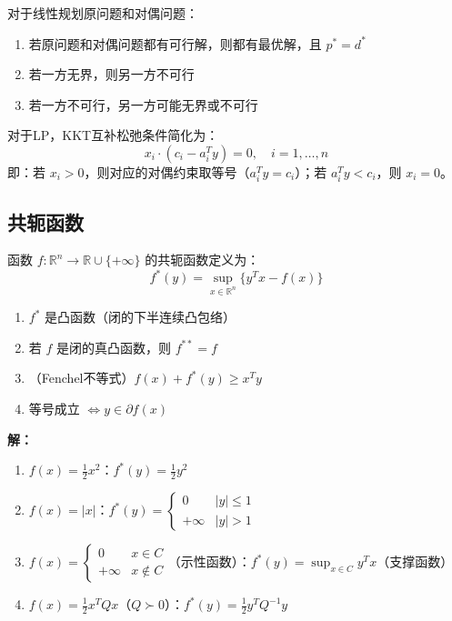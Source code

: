 \begin{theorem}[LP对偶定理]
对于线性规划原问题和对偶问题：
\begin{enumerate}
    \item 若原问题和对偶问题都有可行解，则都有最优解，且 $p^* = d^*$
    \item 若一方无界，则另一方不可行
    \item 若一方不可行，另一方可能无界或不可行
\end{enumerate}
\end{theorem}

\begin{notebox}[互补松弛条件（LP）]
对于LP，KKT互补松弛条件简化为：
\[
x_i \cdot (c_i - a_i^T y) = 0, \quad i = 1, \ldots, n
\]
即：若 $x_i > 0$，则对应的对偶约束取等号（$a_i^T y = c_i$）；若 $a_i^T y < c_i$，则 $x_i = 0$。
\end{notebox}

\subsection{共轭函数}

\begin{definition}[Fenchel共轭函数]
函数 $f: \mathbb{R}^n \to \mathbb{R} \cup \{+\infty\}$ 的共轭函数定义为：
\[
f^*(y) = \sup_{x \in \mathbb{R}^n} \{y^T x - f(x)\}
\]
\end{definition}

\begin{theorem}[共轭函数的性质]
\begin{enumerate}
    \item $f^*$ 是凸函数（闭的下半连续凸包络）
    \item 若 $f$ 是闭的真凸函数，则 $f^{**} = f$
    \item （Fenchel不等式）$f(x) + f^*(y) \geq x^T y$
    \item 等号成立 $\Leftrightarrow y \in \partial f(x)$
\end{enumerate}
\end{theorem}

\begin{example}[常见共轭函数]
\textbf{解：}

\begin{enumerate}
    \item $f(x) = \frac{1}{2}x^2$：$f^*(y) = \frac{1}{2}y^2$
    \item $f(x) = |x|$：$f^*(y) = \begin{cases} 0 & |y| \leq 1 \\ +\infty & |y| > 1 \end{cases}$
    \item $f(x) = \begin{cases} 0 & x \in C \\ +\infty & x \notin C \end{cases}$（示性函数）：$f^*(y) = \sup_{x \in C} y^T x$（支撑函数）
    \item $f(x) = \frac{1}{2}x^T Q x$（$Q \succ 0$）：$f^*(y) = \frac{1}{2}y^T Q^{-1} y$
\end{enumerate}
\end{example}


